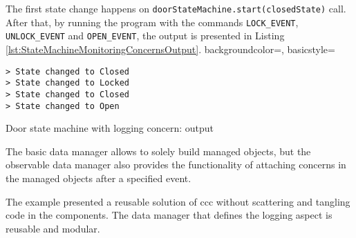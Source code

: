 The first state change happens on \texttt{doorStateMachine.start(closedState)} call.
After that, by running the program with the commands \texttt{LOCK\_EVENT}, \texttt{UNLOCK\_EVENT} and \texttt{OPEN\_EVENT}, the output is presented in Listing \ref{lst:StateMachineMonitoringConcernsOutput}.
 {
    backgroundcolor=\color{white},
    basicstyle=\scriptsize\color{black}\ttfamily
}

\begin{sourcecode} [H]
	\lstset{numbers=none}
	\begin{lstlisting}[style=Bash]
> State changed to Closed
> State changed to Locked
> State changed to Closed
> State changed to Open
	\end{lstlisting}
	\caption{Door state machine with logging concern: output}
	\label{lst:StateMachineMonitoringConcernsOutput}
\end{sourcecode}

The basic data manager allows to solely build managed objects, but the observable data manager also provides the functionality of attaching concerns in the managed objects after a specified event.

The example presented a reusable solution of \ac{ccc} without scattering and tangling code in the components.
The data manager that defines the logging aspect is reusable and modular.




